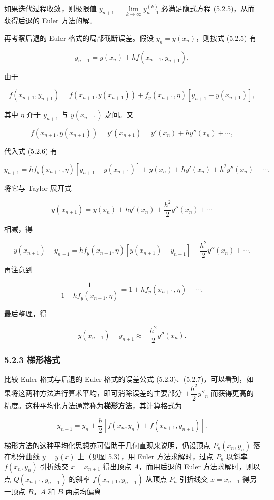 \documentclass[
  10pt,
  fontset=fandol]{ctexart}
\begin{document}
如果迭代过程收敛，则极限值 \(y_{n+1}=\lim\limits_{k\to\infty}y_{n+1}^{(k)}\) 必满足隐式方程 (5.2.5)，从而获得后退的 Euler 方法的解。

再考察后退的 Euler 格式的局部截断误差。假设 \(y_n=y(x_n)\)，则按式 (5.2.5) 有

\[
y_{n+1}=y(x_n)+hf(x_{n+1},y_{n+1}),\tag{5.2.6}
\]

由于

\[
f(x_{n+1},y_{n+1})=f(x_{n+1},y(x_{n+1}))+f_y(x_{n+1},\eta)[y_{n+1}-y(x_{n+1})],
\]

其中 \(\eta\) 介于 \(y_{n+1}\) 与 \(y(x_{n+1})\) 之间。又

\[
f(x_{n+1},y(x_{n+1}))=y'(x_{n+1})=y'(x_n)+hy''(x_n)+\cdots,
\]

代入式 (5.2.6) 有

\[
y_{n+1}=hf_y(x_{n+1},\eta)[y_{n+1}-y(x_{n+1})]+y(x_n)+hy'(x_n)+h^2y''(x_n)+\cdots,
\]

将它与 Taylor 展开式

\[
y(x_{n+1})=y(x_n)+hy'(x_n)+\frac{h^2}{2}y''(x_n)+\cdots
\]

相减，得

\[
y(x_{n+1})-y_{n+1}=hf_y(x_{n+1},\eta)[y(x_{n+1})-y_{n+1}]-\frac{h^2}{2}y''(x_n)+\cdots.
\]

再注意到

\[
\frac{1}{1-hf_y(x_{n+1},\eta)}=1+hf_y(x_{n+1},\eta)+\cdots,
\]

最后整理，得

\[
y(x_{n+1})-y_{n+1}\approx-\frac{h^2}{2}y''(x_n).\tag{5.2.7}
\]

\subsubsection{5.2.3 梯形格式}\label{ux68afux5f62ux683cux5f0f}

比较 Euler 格式与后退的 Euler 格式的误差公式 (5.2.3)、(5.2.7)，可以看到，如果将这两种方法进行算术平均，即可消除误差的主要部分 \(\pm\dfrac{h^2}{2}y''_n\) 而获得更高的精度。这种平均化方法通常称为\textbf{梯形方法}，其计算格式为

\[
y_{n+1}=y_n+\frac{h}{2}[f(x_n,y_n)+f(x_{n+1},y_{n+1})].\tag{5.2.8}
\]

梯形方法的这种平均化思想亦可借助于几何直观来说明，仍设顶点 \(P_n(x_n,y_n)\) 落在积分曲线 \(y=y(x)\) 上（见图 5.3），用 Euler 方法求解时，过点 \(P_n\) 以斜率 \(f(x_n,y_n)\) 引折线交 \(x=x_{n+1}\) 得出顶点 \(A\)，而用后退的 Euler 方法求解时，则以点 \(Q(x_{n+1},y_{n+1})\) 的斜率 \(f(x_{n+1},y_{n+1})\) 从顶点 \(P_n\) 引折线交 \(x=x_{n+1}\) 得另一顶点 \(B\)。\(A\) 和 \(B\) 两点均偏离
\end{document}
